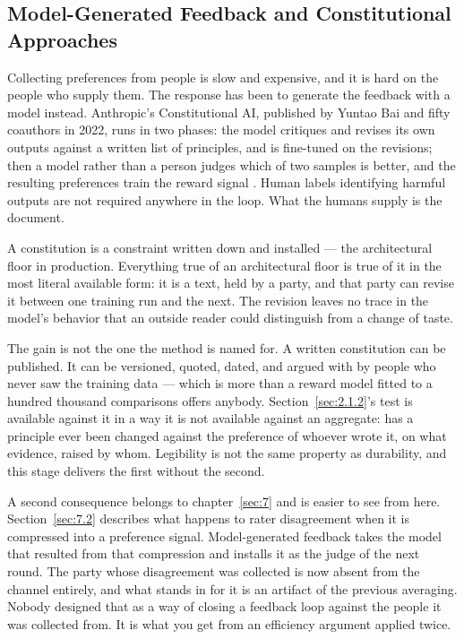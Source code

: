 \subsection{Model-Generated Feedback and Constitutional Approaches}
\label{sec:4.2.4}
Collecting preferences from people is slow and expensive, and it is hard on the people who supply them. The response has been to generate the feedback with a model instead. Anthropic's Constitutional AI, published by Yuntao Bai and fifty coauthors in 2022, runs in two phases: the model critiques and revises its own outputs against a written list of principles, and is fine-tuned on the revisions; then a model rather than a person judges which of two samples is better, and the resulting preferences train the reward signal \autocite{bai2022constitutional}. Human labels identifying harmful outputs are not required anywhere in the loop. What the humans supply is the document.

A constitution is a constraint written down and installed — the architectural floor in production. Everything true of an architectural floor is true of it in the most literal available form: it is a text, held by a party, and that party can revise it between one training run and the next. The revision leaves no trace in the model's behavior that an outside reader could distinguish from a change of taste.

The gain is not the one the method is named for. A written constitution can be published. It can be versioned, quoted, dated, and argued with by people who never saw the training data — which is more than a reward model fitted to a hundred thousand comparisons offers anybody. Section~\ref{sec:2.1.2}'s test is available against it in a way it is not available against an aggregate: has a principle ever been changed against the preference of whoever wrote it, on what evidence, raised by whom. Legibility is not the same property as durability, and this stage delivers the first without the second.

A second consequence belongs to chapter~\ref{sec:7} and is easier to see from here. Section~\ref{sec:7.2} describes what happens to rater disagreement when it is compressed into a preference signal. Model-generated feedback takes the model that resulted from that compression and installs it as the judge of the next round. The party whose disagreement was collected is now absent from the channel entirely, and what stands in for it is an artifact of the previous averaging. Nobody designed that as a way of closing a feedback loop against the people it was collected from. It is what you get from an efficiency argument applied twice.
